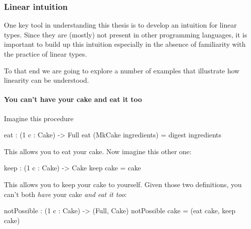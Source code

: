 \documentclass[
]{article}
\newenvironment{Shaded}{}{}
\newcommand{\DataTypeTok}[1]{\textcolor[rgb]{0.56,0.13,0.00}{#1}}
\newcommand{\DecValTok}[1]{\textcolor[rgb]{0.25,0.63,0.44}{#1}}
\newcommand{\NormalTok}[1]{#1}
\newcommand{\OperatorTok}[1]{\textcolor[rgb]{0.40,0.40,0.40}{#1}}
\newcommand{\OtherTok}[1]{\textcolor[rgb]{0.00,0.44,0.13}{#1}}
\begin{document}
\hypertarget{linear-intuition}{%
\subsubsection{Linear intuition}\label{linear-intuition}}

One key tool in understanding this thesis is to develop an intuition for
linear types. Since they are (mostly) not present in other programming
languages, it is important to build up this intuition especially in the
absence of familiarity with the practice of linear types.

To that end we are going to explore a number of examples that illustrate
how linearity can be understood.

\hypertarget{you-cant-have-your-cake-and-eat-it-too}{%
\paragraph{You can't have your cake and eat it
too}\label{you-cant-have-your-cake-and-eat-it-too}}

Imagine this procedure

\begin{Shaded}
\begin{Highlighting}[]
\NormalTok{eat }\OperatorTok{:}\NormalTok{ (}\DecValTok{1}\NormalTok{ c }\OperatorTok{:} \DataTypeTok{Cake}\NormalTok{) }\OtherTok{{-}\textgreater{}} \DataTypeTok{Full}
\NormalTok{eat (}\DataTypeTok{MkCake}\NormalTok{ ingredients) }\OtherTok{=}\NormalTok{ digest ingredients}
\end{Highlighting}
\end{Shaded}

This allows you to eat your cake. Now imagine this other one:

\begin{Shaded}
\begin{Highlighting}[]
\NormalTok{keep }\OperatorTok{:}\NormalTok{ (}\DecValTok{1}\NormalTok{ c }\OperatorTok{:} \DataTypeTok{Cake}\NormalTok{) }\OtherTok{{-}\textgreater{}} \DataTypeTok{Cake}
\NormalTok{keep cake }\OtherTok{=}\NormalTok{ cake}
\end{Highlighting}
\end{Shaded}

This allows you to keep your cake to yourself. Given those two
definitions, you can't both \emph{have} your cake \emph{and eat it too}:

\begin{Shaded}
\begin{Highlighting}[]
\NormalTok{notPossible }\OperatorTok{:}\NormalTok{ (}\DecValTok{1}\NormalTok{ c }\OperatorTok{:} \DataTypeTok{Cake}\NormalTok{) }\OtherTok{{-}\textgreater{}}\NormalTok{ (}\DataTypeTok{Full}\NormalTok{, }\DataTypeTok{Cake}\NormalTok{)}
\NormalTok{notPossible cake }\OtherTok{=}\NormalTok{ (eat cake, keep cake)}
\end{Highlighting}
\end{Shaded}
\end{document}
